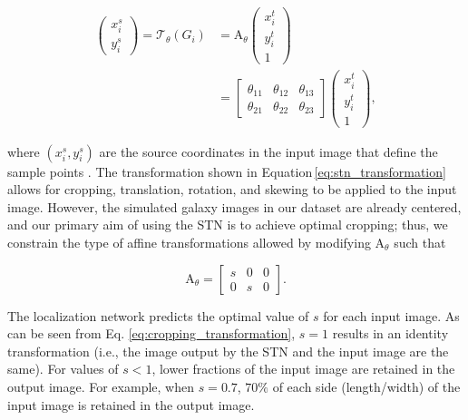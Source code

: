 \begin{equation}
\begin{split}
\left(\begin{array}{c}
x_{i}^{s} \\
y_{i}^{s}
\end{array}\right)=\mathcal{T}_{\theta}\left(G_{i}\right) & = \mathrm{A}_{\theta}\left(\begin{array}{c}
x_{i}^{t} \\
y_{i}^{t} \\
1
\end{array}\right) \\
& = \left[\begin{array}{lll}
\theta_{11} & \theta_{12} & \theta_{13} \\
\theta_{21} & \theta_{22} & \theta_{23}
\end{array}\right]\left(\begin{array}{c}
x_{i}^{t} \\
y_{i}^{t} \\
1
\end{array}\right) ,
\end{split}
\label{eq:stn_transformation}
\end{equation}

\noindent
where $ \left(x_i^s,y_i^s\right)$ are the source coordinates in the input image that define the sample points \citep{jarderberg_15}. The transformation shown in Equation\,\ref{eq:stn_transformation} allows for cropping, translation, rotation, and skewing to be applied to the input image. However, the simulated galaxy images in our dataset are already centered, and our primary aim of using the STN is to achieve optimal cropping; thus, we constrain the type of affine transformations allowed by modifying $\mathrm{A}_{\theta}$ such that 

\begin{equation}
\mathrm{A}_{\theta} = \left[\begin{array}{lll}
s & 0 & 0 \\
0 & s & 0
\end{array}\right] .
\label{eq:cropping_transformation}
\end{equation}

\noindent
The localization network predicts the optimal value of $s$ for each input image. As can be seen from Eq. \ref{eq:cropping_transformation}, $s=1$ results in an identity transformation (i.e., the image output by the STN and the input image are the same). For values of $s < 1$, lower fractions of the input image are retained in the output image. For example, when $s=0.7$, $70\%$ of each side (length/width) of the input image is retained in the output image.

